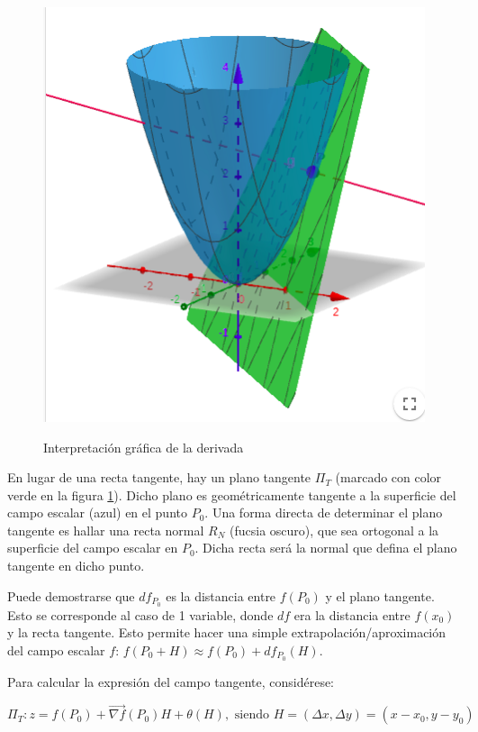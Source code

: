\documentclass{article}
\begin{document}
\begin{figure}[ht]
\caption{Interpretación gráfica de la derivada}
\centering
\includegraphics[scale=0.6]{img/teo_fig011_dg.png} 
\label{fig:deriv_graf}
\end{figure}

En lugar de una recta tangente, hay un plano tangente $\Pi_T$ (marcado con color verde en la figura \ref{fig:deriv_graf}). Dicho plano es geométricamente tangente a la superficie del campo escalar (azul) en el punto $P_0$. Una forma directa de determinar el plano tangente es hallar una recta normal $R_N$ (fucsia oscuro), que sea ortogonal a la superficie del campo escalar en $P_0$. Dicha recta será la normal que defina el plano tangente en dicho punto.

Puede demostrarse que $df_{P_0}$ es la distancia entre $f(P_0)$ y el plano tangente. Esto se corresponde al caso de 1 variable, donde $df$ era la distancia entre $f(x_0)$ y la recta tangente. Esto permite hacer una simple extrapolación/aproximación del campo escalar $f$: $f(P_0 + H) \approx f(P_0) + df_{P_0}(H)$. 

Para calcular la expresión del campo tangente, considérese:

\begin{equation}
\Pi_T: z = f(P_0) + \overrightarrow{\nabla{f}}(P_0) H + \theta(H), \text{ siendo } H = (\Delta x, \Delta y) = (x-x_0, y-y_0)
\end{equation}
\end{document}
